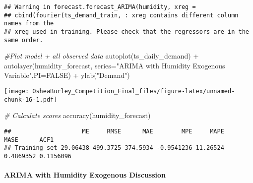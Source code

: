 \documentclass[
]{article}
\newenvironment{Shaded}{\begin{snugshade}}{\end{snugshade}}
\newcommand{\AttributeTok}[1]{\textcolor[rgb]{0.77,0.63,0.00}{#1}}
\newcommand{\CommentTok}[1]{\textcolor[rgb]{0.56,0.35,0.01}{\textit{#1}}}
\newcommand{\ConstantTok}[1]{\textcolor[rgb]{0.00,0.00,0.00}{#1}}
\newcommand{\FunctionTok}[1]{\textcolor[rgb]{0.00,0.00,0.00}{#1}}
\newcommand{\NormalTok}[1]{#1}
\newcommand{\OtherTok}[1]{\textcolor[rgb]{0.56,0.35,0.01}{#1}}
\newcommand{\SpecialCharTok}[1]{\textcolor[rgb]{0.00,0.00,0.00}{#1}}
\newcommand{\StringTok}[1]{\textcolor[rgb]{0.31,0.60,0.02}{#1}}
\begin{document}
\begin{verbatim}
## Warning in forecast.forecast_ARIMA(humidity, xreg =
## cbind(fourier(ts_demand_train, : xreg contains different column names from the
## xreg used in training. Please check that the regressors are in the same order.
\end{verbatim}

\begin{Shaded}
\begin{Highlighting}[]
\CommentTok{\#Plot model + all observed data}
\FunctionTok{autoplot}\NormalTok{(ts\_daily\_demand) }\SpecialCharTok{+}
  \FunctionTok{autolayer}\NormalTok{(humidity\_forecast, }\AttributeTok{series=}\StringTok{"ARIMA with Humidity Exogenous Variable"}\NormalTok{,}\AttributeTok{PI=}\ConstantTok{FALSE}\NormalTok{) }\SpecialCharTok{+}
  \FunctionTok{ylab}\NormalTok{(}\StringTok{"Demand"}\NormalTok{)}
\end{Highlighting}
\end{Shaded}

\texttt{[image: OsheaBurley\_Competition\_Final\_files/figure-latex/unnamed-chunk-16-1.pdf]}

\begin{Shaded}
\begin{Highlighting}[]
\CommentTok{\# Calculate scores}
\FunctionTok{accuracy}\NormalTok{(humidity\_forecast)}
\end{Highlighting}
\end{Shaded}

\begin{verbatim}
##                    ME     RMSE      MAE        MPE     MAPE      MASE      ACF1
## Training set 29.06438 499.3725 374.5934 -0.9541236 11.26524 0.4869352 0.1156096
\end{verbatim}

\begin{Shaded}
\end{Shaded}

\hypertarget{arima-with-humidity-exogenous-discussion}{%
\paragraph{ARIMA with Humidity Exogenous
Discussion}\label{arima-with-humidity-exogenous-discussion}}
\end{document}
